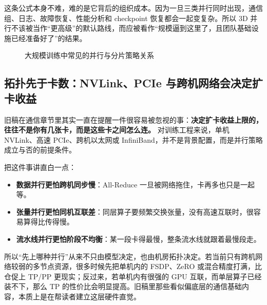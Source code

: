 这条公式本身不难，难的是它背后的组织成本。因为一旦三类并行同时出现，通信组、日志、故障恢复、性能分析和 checkpoint 恢复都会一起变复杂。所以 3D 并行不该被当作“更高级”的默认路线，而应被看作“规模逼到这里了，且团队基础设施已经准备好了”的结果。

\begin{figure}[H]
\centering
{}
\caption{大规模训练中常见的并行与分片策略关系}
\label{fig:distributed-strategies}
\end{figure}

\subsection{拓扑先于卡数：NVLink、PCIe 与跨机网络会决定扩卡收益}
旧稿在通信章节里其实一直在提醒一件很容易被忽视的事：\textbf{决定扩卡收益上限的，往往不是你有几张卡，而是这些卡之间怎么连。} 对训练工程来说，单机 NVLink、高速 PCIe、跨机以太网或 InfiniBand，并不是背景配置，而是并行策略成立与否的前提条件。

把这件事讲直白一点：
\begin{itemize}
  \item \textbf{数据并行更怕跨机同步慢}：All-Reduce 一旦被网络拖住，卡再多也只是一起等。
  \item \textbf{张量并行更怕同机互联差}：同层算子要频繁交换张量，没有高速互联时，很容易算得比传得慢。
  \item \textbf{流水线并行更怕阶段不均衡}：某一段卡得最慢，整条流水线就跟着最慢段走。
\end{itemize}

所以“先上哪种并行”从来不只由模型决定，也由机房拓扑决定。若当前只有跨机网络较弱的多节点资源，很多时候先把单机内的 FSDP、ZeRO 或混合精度打满，比仓促上 TP/PP 更现实；反过来，若单机内有很强的 GPU 互联，而单层算子已经装不下，那么 TP 的性价比会明显提高。旧稿里那些看似偏底层的通信基础内容，本质上是在帮读者建立这层硬件直觉。

